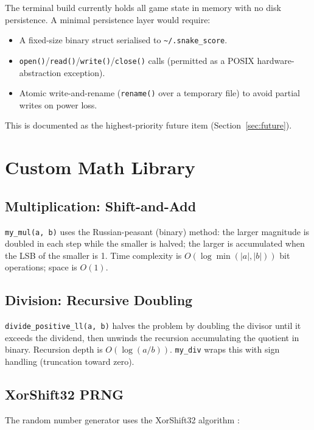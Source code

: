 \documentclass[conference]{IEEEtran}
\begin{document}
The terminal build currently holds all game state in memory with no disk
persistence. A minimal persistence layer would require:
\begin{itemize}
  \item A fixed-size binary struct serialised to \texttt{\textasciitilde/.snake\_score}.
  \item \texttt{open()}/\texttt{read()}/\texttt{write()}/\texttt{close()} calls
        (permitted as a POSIX hardware-abstraction exception).
  \item Atomic write-and-rename (\texttt{rename()} over a temporary file) to
        avoid partial writes on power loss.
\end{itemize}

This is documented as the highest-priority future item (Section~\ref{sec:future}).

\section{Custom Math Library}

\subsection{Multiplication: Shift-and-Add}

\texttt{my\_mul(a, b)} uses the Russian-peasant (binary) method: the larger
magnitude is doubled in each step while the smaller is halved; the larger is
accumulated when the LSB of the smaller is 1. Time complexity is
$O(\log\min(|a|,|b|))$ bit operations; space is $O(1)$.

\subsection{Division: Recursive Doubling}

\texttt{divide\_positive\_ll(a, b)} halves the problem by doubling the
divisor until it exceeds the dividend, then unwinds the recursion accumulating
the quotient in binary. Recursion depth is $O(\log(a/b))$. \texttt{my\_div}
wraps this with sign handling (truncation toward zero).

\subsection{XorShift32 PRNG}

The random number generator uses the XorShift32 algorithm \cite{marsaglia2003xorshift}:
\end{document}
